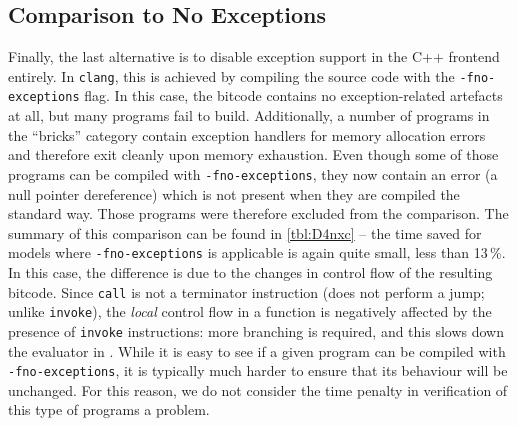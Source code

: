 \subsection{Comparison to No
Exceptions}\label{comparison-to-no-exceptions}

Finally, the last alternative is to disable exception support in the C++
frontend entirely. In \texttt{clang}, this is achieved by compiling the
source code with the \texttt{-fno-exceptions} flag. In this case, the
\llvm{} bitcode contains no exception-related artefacts at all, but many
programs fail to build. Additionally, a number of programs in the
``bricks'' category contain exception handlers for memory allocation
errors and therefore exit cleanly upon memory exhaustion. Even
though some of those programs can be compiled with
\texttt{-fno-exceptions}, they now contain an error (a null pointer
dereference) which is not present when they are compiled the standard
way.
Those programs were therefore excluded from the comparison. The
summary of this comparison can be found in \autoref{tbl:D4nxc} -- the
time saved for models where \texttt{-fno-exceptions} is applicable is
again quite small, less than 13\,\%. In this case, the difference is due
to the changes in control flow of the resulting \llvm{} bitcode. Since
\texttt{call} is not a terminator instruction (does not perform a jump; unlike
\texttt{invoke}),
the \emph{local} control flow in a function is negatively affected by
the presence of \texttt{invoke} instructions: more branching is
required, and this slows down the evaluator in \divm{}. While it is easy to
see if a given program can be compiled with \texttt{-fno-exceptions}, it
is typically much harder to ensure that its behaviour will be unchanged.
For this reason, we do not consider the time penalty in verification of
this type of programs a problem.


